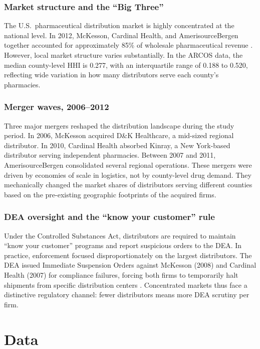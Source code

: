 \documentclass[12pt]{article}
\begin{document}
\subsubsection*{Market structure and the ``Big Three''} The U.S.\ pharmaceutical distribution market is highly concentrated at the national level. In 2012, McKesson, Cardinal Health, and AmerisourceBergen together accounted for approximately 85\% of wholesale pharmaceutical revenue \citep{drugchannels2013}. However, local market structure varies substantially. In the ARCOS data, the median county-level HHI is 0.277, with an interquartile range of 0.188 to 0.520, reflecting wide variation in how many distributors serve each county's pharmacies.

\subsubsection*{Merger waves, 2006--2012} Three major mergers reshaped the distribution landscape during the study period. In 2006, McKesson acquired D\&K Healthcare, a mid-sized regional distributor. In 2010, Cardinal Health absorbed Kinray, a New York-based distributor serving independent pharmacies. Between 2007 and 2011, AmerisourceBergen consolidated several regional operations. These mergers were driven by economies of scale in logistics, not by county-level drug demand. They mechanically changed the market shares of distributors serving different counties based on the pre-existing geographic footprints of the acquired firms.

\subsubsection*{DEA oversight and the ``know your customer'' rule} Under the Controlled Substances Act, distributors are required to maintain ``know your customer'' programs and report suspicious orders to the DEA. In practice, enforcement focused disproportionately on the largest distributors. The DEA issued Immediate Suspension Orders against McKesson (2008) and Cardinal Health (2007) for compliance failures, forcing both firms to temporarily halt shipments from specific distribution centers \citep{usdoj2017mckesson}. Concentrated markets thus face a distinctive regulatory channel: fewer distributors means more DEA scrutiny per firm.

\section{Data}
\label{sec:data}
\end{document}
